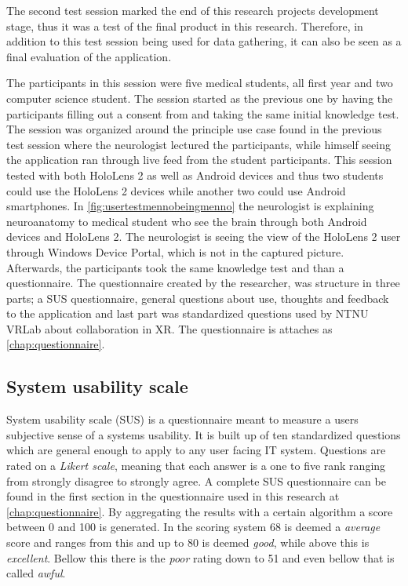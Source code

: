 The second test session marked the end of this research projects development stage, thus it was a test of the final product in this research. Therefore, in addition to this test session being used for data gathering, it can also be seen as a final evaluation of the application. 

The participants in this session were five medical students, all first year and two computer science student. The session started as the previous one by having the participants filling out a consent from and taking the same initial knowledge test. 
The session was organized around the principle use case found in the previous test session where the neurologist lectured the participants, while himself seeing the application ran through live feed from the student participants.
This session tested with both HoloLens 2 as well as Android devices and thus two students could use the HoloLens 2 devices while another two could use Android smartphones. In \autoref{fig:usertestmennobeingmenno} the neurologist is explaining neuroanatomy to medical student who see the brain through both Android devices and HoloLens 2. The neurologist is seeing the view of the HoloLens 2 user through Windows Device Portal, which is not in the captured picture.
Afterwards, the participants took the same knowledge test and than a questionnaire. The questionnaire created by the researcher, was structure in three parts; a SUS questionnaire, general questions about use, thoughts and feedback to the application and last part was standardized questions used by NTNU VRLab about collaboration in XR. The questionnaire is attaches as \autoref{chap:questionnaire}.

\subsection{System usability scale}

System usability scale (SUS) is a questionnaire meant to measure a users subjective sense of a systems usability. It is built up of ten standardized questions which are general enough to apply to any user facing IT system. Questions are rated on a \textit{Likert scale}, meaning that each answer is a one to five rank ranging from strongly disagree to strongly agree. A complete SUS questionnaire can be found in the first section in the questionnaire used in this research at \autoref{chap:questionnaire}. By aggregating the results with a certain algorithm a score between 0 and 100 is generated. In the scoring system 68 is deemed a \textit{average} score and ranges from this and up to 80 is deemed \textit{good}, while above this is \textit{excellent}. Bellow this there is the \textit{poor} rating down to 51 and even bellow that is called \textit{awful}.